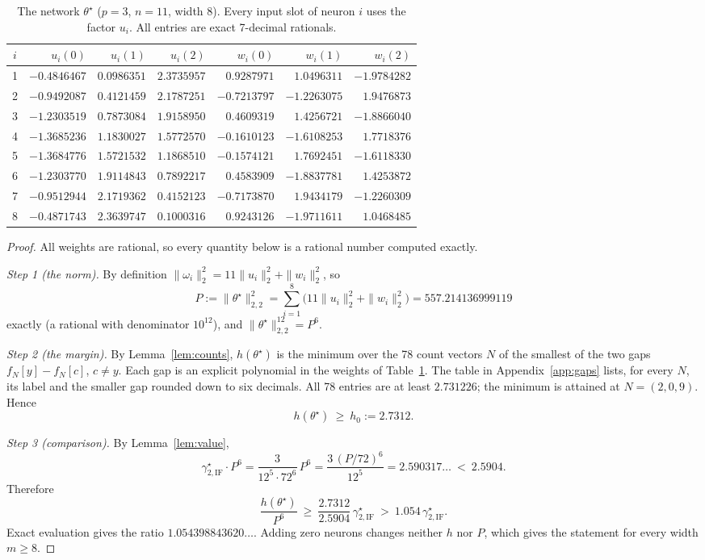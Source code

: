 \documentclass[11pt]{article}
\theoremstyle{definition}
\begin{document}
\begin{table}[h]
\centering\small
\begin{tabular}{c rrr rrr}
\toprule
$i$ & $u_i(0)$ & $u_i(1)$ & $u_i(2)$ & $w_i(0)$ & $w_i(1)$ & $w_i(2)$\\
\midrule
1 & $-0.4846467$ & $0.0986351$ & $2.3735957$ & $0.9287971$ & $1.0496311$ & $-1.9784282$\\
2 & $-0.9492087$ & $0.4121459$ & $2.1787251$ & $-0.7213797$ & $-1.2263075$ & $1.9476873$\\
3 & $-1.2303519$ & $0.7873084$ & $1.9158950$ & $0.4609319$ & $1.4256721$ & $-1.8866040$\\
4 & $-1.3685236$ & $1.1830027$ & $1.5772570$ & $-0.1610123$ & $-1.6108253$ & $1.7718376$\\
5 & $-1.3684776$ & $1.5721532$ & $1.1868510$ & $-0.1574121$ & $1.7692451$ & $-1.6118330$\\
6 & $-1.2303770$ & $1.9114843$ & $0.7892217$ & $0.4583909$ & $-1.8837781$ & $1.4253872$\\
7 & $-0.9512944$ & $2.1719362$ & $0.4152123$ & $-0.7173870$ & $1.9434179$ & $-1.2260309$\\
8 & $-0.4871743$ & $2.3639747$ & $0.1000316$ & $0.9243126$ & $-1.9711611$ & $1.0468485$\\
\bottomrule
\end{tabular}
\caption{The network $\theta^\star$ ($p=3$, $n=11$, width $8$). Every input slot of neuron $i$ uses the factor $u_i$.
All entries are exact 7-decimal rationals.}
\label{tab:w11}
\end{table}

\begin{proof}
All weights are rational, so every quantity below is a rational number computed exactly.

\emph{Step 1 (the norm).} By definition $\|\omega_i\|_2^2=11\|u_i\|_2^2+\|w_i\|_2^2$, so
\[
P:=\|\theta^\star\|_{2,2}^2=\sum_{i=1}^8\big(11\|u_i\|_2^2+\|w_i\|_2^2\big)=557.214136999119
\]
exactly (a rational with denominator $10^{12}$), and $\|\theta^\star\|_{2,2}^{12}=P^6$.

\emph{Step 2 (the margin).} By Lemma~\ref{lem:counts}, $h(\theta^\star)$ is the minimum over the 78 count vectors
$N$ of the smallest of the two gaps $f_N[y]-f_N[c]$, $c\neq y$. Each gap is an explicit polynomial in the
weights of Table~\ref{tab:w11}. The table in Appendix~\ref{app:gaps} lists, for every $N$, its label and the smaller gap rounded
down to six decimals. All 78 entries are at least $2.731226$; the minimum is attained at $N=(2,0,9)$. Hence
\[
h(\theta^\star)\ \ge\ h_0:=2.7312 .
\]

\emph{Step 3 (comparison).} By Lemma~\ref{lem:value},
\[
\gamma^\star_{2,\mathrm{IF}}\cdot P^6=\frac{3}{12^5\cdot72^6}\,P^6=\frac{3\,(P/72)^6}{12^5}=2.590317\ldots\ <\ 2.5904 .
\]
Therefore
\[
\frac{h(\theta^\star)}{P^6}\ \ge\ \frac{2.7312}{2.5904}\,\gamma^\star_{2,\mathrm{IF}}\ >\ 1.054\,\gamma^\star_{2,\mathrm{IF}} .
\]
Exact evaluation gives the ratio $1.054398843620\ldots$. Adding zero neurons changes neither $h$ nor $P$, which
gives the statement for every width $m\ge8$.
\end{proof}
\end{document}

